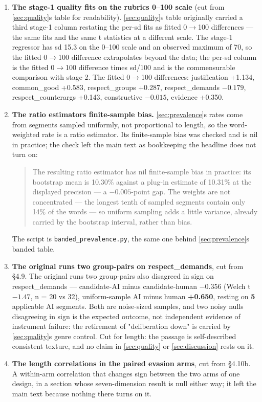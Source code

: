 \begin{enumerate}
\def\labelenumi{\arabic{enumi}.}
\item
  \textbf{The stage-1 quality fits on the rubric\textquotesingle s 0--100 scale} (cut from \cref{sec:quality}\textquotesingle s
  table for readability). \cref{sec:quality}\textquotesingle s table originally carried a third stage-1
  column restating the per-sd fits as fitted 0\(\rightarrow\)100 differences --- the same fits
  and the same t statistics at a different scale. The stage-1 regressor has sd
  15.3 on the 0--100 scale and an observed maximum of 70, so the fitted 0\(\rightarrow\)100
  difference extrapolates beyond the data; the per-sd column is the fitted
  0\(\rightarrow\)100 difference times sd/100 and is the commensurable comparison with stage
  2. The fitted 0\(\rightarrow\)100 differences: justification +1.134, common\_good +0.583,
  respect\_groups +0.287, respect\_demands \(-0.179\), respect\_counterargs +0.143,
  constructive \(-0.015\), evidence +0.350.
\item
  \textbf{The ratio estimator\textquotesingle s finite-sample bias.} \cref{sec:prevalence}\textquotesingle s rates come from
  segments sampled uniformly, not proportional to length, so the word-weighted
  rate is a ratio estimator. Its finite-sample bias was checked and is nil in
  practice; the check left the main text as bookkeeping the headline does not
  turn on:

  \begin{quote}
  The resulting ratio estimator has nil finite-sample bias in practice: its
  bootstrap mean is 10.30\% against a plug-in estimate of 10.31\% at the
  displayed precision --- a \(-0.005\)-point gap. The weights are not
  concentrated --- the longest tenth of sampled segments contain only 14\% of
  the words --- so uniform sampling adds a little variance, already carried by
  the bootstrap interval, rather than bias.
  \end{quote}

  The script is \texttt{banded\_prevalence.py}, the same one behind \cref{sec:prevalence}\textquotesingle s banded
  table.
\item
  \textbf{The original run\textquotesingle s two group-pairs on respect\_demands}, cut from §4.9.
  The original run\textquotesingle s two group-pairs also disagreed in sign on
  respect\_demands --- candidate-AI minus candidate-human \textbf{\(-0.356\)} (Welch
  t \(-1.47\), n = 20 vs 32), uniform-sample AI minus human \textbf{+0.650}, resting on
  \textbf{5} applicable AI segments. Both are noise-sized samples, and two noisy
  nulls disagreeing in sign is the expected outcome, not independent evidence
  of instrument failure: the retirement of "deliberation down" is carried by
  \cref{sec:quality}\textquotesingle s genre control. Cut for length: the passage is self-described
  consistent texture, and no claim in \cref{sec:quality} or \cref{sec:discussion} rests on it.
\item
  \textbf{The length correlations in the paired evasion arms}, cut from §4.10b.
  A within-arm correlation that changes sign between the two arms of one
  design, in a section whose seven-dimension result is null either way; it
  left the main text because nothing there turns on it.


\end{enumerate}
